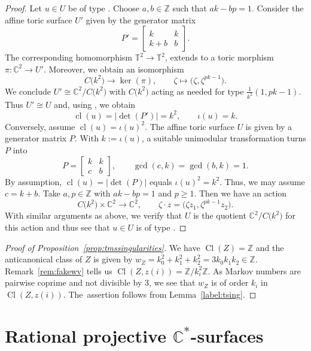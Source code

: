 \documentclass[10pt,a4paper]{amsart}
\theoremstyle{definition}
\def\CC{{\mathbb C}}
\def\TT{{\mathbb T}}
\def\ZZ{{\mathbb Z}}
\DeclareMathOperator{\Cl}{Cl}
\DeclareMathOperator{\cl}{cl}
\begin{document}
\begin{proof}
Let $u \in U$ be of type .
Choose $a,b \in \ZZ$ such that $ak - bp = 1$.
Consider the affine toric surface $U'$ given by the
generator matrix
\[
P'
 =
\begin{bmatrix}
k & k
\\
k + b & b
\end{bmatrix}.
\]
The corresponding homomorphism $\TT^2 \to \TT^2$,
extends to a toric morphism $\pi \colon \CC^2 \to U'$.
Moreover, we obtain an isomorphism
\[
C\bigl(k^2\bigr) \to \ker(\pi),
\qquad
\zeta \mapsto \bigl(\zeta, \zeta^{pk-1}\bigr).
\]
We conclude $U' \cong \CC^2/C\bigl(k^2\bigr)$ with $C\bigl(k^2\bigr)$ acting
as needed for type $\frac{1}{k^2}(1,pk-1)$.
Thus $U' \cong U$ and, using \cite[Remark~3.7]{HaHaSp},
we obtain
\[
\cl(u) = \vert {\det}(P') \vert = k^2,
\qquad
\iota(u) = k.
\]
Conversely, assume $\cl(u) = \iota(u)^2$.
The affine toric surface $U$
is given by a generator matrix $P$.
With $k := \iota(u)$, a suitable unimodular transformation
turns $P$ into
\[
P
 =
\begin{bmatrix}
k & k
\\
c & b
\end{bmatrix},
\qquad
\gcd(c,k) = \gcd(b,k)=1.
\]
By assumption, $\cl(u) = \vert {\det}(P) \vert$
equals $\iota(u)^2 = k^2$.
Thus, we may assume $c = k+b$.
Take $a,p \in \ZZ$ with
$ak - bp = 1$ and $p \ge 1$.
Then we have an action
\[
C\bigl(k^2\bigr) \times \CC^2 \to \CC^2,
\qquad
\zeta \cdot z = \bigl(\zeta z_1, \zeta^{pk-1} z_2\bigr).
\]
With similar arguments as above, we verify that
$U$ is the quotient $\CC^2/C\bigl(k^2\bigr)$ for this action
and thus see that $u \in U$ is of type
.
\end{proof}

\begin{proof}[Proof of Proposition~\ref{prop:tmssingularities}]
We have $\Cl(Z) = \ZZ$ and the anticanonical class of $Z$ is
given by $w_Z = k_0^2+k_1^2+k_2^2 = 3k_0k_1k_2 \in \ZZ$.
Remark~\ref{rem:fakewv} tells us $\Cl(Z,z(i)) = \ZZ / k_i^2\ZZ$.
As Markov numbers are pairwise coprime and not divisible by 3,
we see that $w_Z$ is of order $k_i$ in $\Cl(Z,z(i))$.
The~assertion follows from Lemma~\ref{label:tsing}.
\end{proof}

\section[Rational projective C*-surfaces]{Rational projective $\boldsymbol{\CC^*}$-surfaces}
\end{document}
